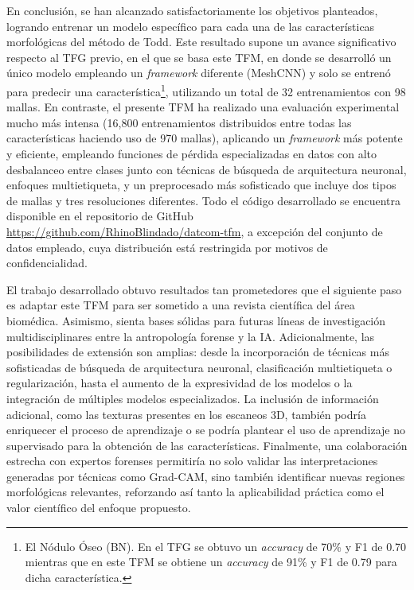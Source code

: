 En conclusión, se han alcanzado satisfactoriamente los objetivos planteados, logrando entrenar un modelo específico para cada una de las características morfológicas del método de Todd. Este resultado supone un avance significativo respecto al TFG previo, en el que se basa este TFM, en donde se desarrolló un único modelo empleando un \textit{framework} diferente (MeshCNN) y solo se entrenó para predecir una característica\footnote{El Nódulo Óseo (BN). En el TFG se obtuvo un \textit{accuracy} de 70\% y F1 de 0.70 mientras que en este TFM se obtiene un \textit{accuracy} de 91\% y F1 de 0.79 para dicha característica.}, utilizando un total de 32 entrenamientos con 98 mallas. En contraste, el presente TFM ha realizado una evaluación experimental mucho más intensa (16,800 entrenamientos distribuidos entre todas las características haciendo uso de 970 mallas), aplicando un \textit{framework} más potente y eficiente, empleando funciones de pérdida especializadas en datos con alto desbalanceo entre clases junto con técnicas de búsqueda de arquitectura neuronal, enfoques multietiqueta, y un preprocesado más sofisticado que incluye dos tipos de mallas y tres resoluciones diferentes. Todo el código desarrollado se encuentra disponible en el repositorio de GitHub \url{https://github.com/RhinoBlindado/datcom-tfm}, a excepción del conjunto de datos empleado, cuya distribución está restringida por motivos de confidencialidad.

El trabajo desarrollado obtuvo resultados tan prometedores que el siguiente paso es adaptar este TFM para ser sometido a una revista científica del área biomédica. Asimismo, sienta bases sólidas para futuras líneas de investigación multidisciplinares entre la antropología forense y la IA. Adicionalmente, las posibilidades de extensión son amplias: desde la incorporación de técnicas más sofisticadas de búsqueda de arquitectura neuronal, clasificación multietiqueta o regularización, hasta el aumento de la expresividad de los modelos o la integración de múltiples modelos especializados. La inclusión de información adicional, como las texturas presentes en los escaneos 3D, también podría enriquecer el proceso de aprendizaje o se podría plantear el uso de aprendizaje no supervisado para la obtención de las características. Finalmente, una colaboración estrecha con expertos forenses permitiría no solo validar las interpretaciones generadas por técnicas como Grad-CAM, sino también identificar nuevas regiones morfológicas relevantes, reforzando así tanto la aplicabilidad práctica como el valor científico del enfoque propuesto.